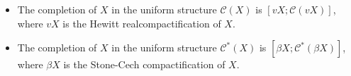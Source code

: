 \begin{itemize}
\item[(a)] The completion of $X$ in the uniform structure $\mathcal{C}(X)$ is $[vX; \mathcal{C}(vX)]$, where $vX$ is the Hewitt realcompactification of $X$.
\item[(a*)] The completion of $X$ in the uniform structure $\mathcal{C}^*(X)$ is $[\beta X; \mathcal{C}^*(\beta X)]$, where $\beta X$ is the Stone-Cech compactification of $X$.
\end{itemize}
